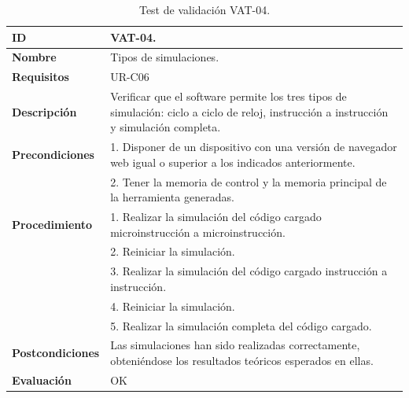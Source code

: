 \begin{center}
\begin{table}[htb]
\centering
\caption{Test de validación VAT-04.}
\begin{tabular}{@{}p{2.5cm} p{9cm}@{}} 
\toprule
\textbf{ID} 					& VAT-04. \\
\midrule
\textbf{Nombre} 				& Tipos de simulaciones. \\
\midrule
\textbf{Requisitos} 		& UR-C06\\
\midrule
\textbf{Descripción} 		& Verificar que el software permite los tres tipos de simulación: ciclo a ciclo de reloj, instrucción a instrucción y simulación completa. \\
\midrule
\textbf{Precondiciones}		& 1. Disponer de un dispositivo con una versión de navegador web igual o superior a los indicados anteriormente. \\
											& 2. Tener la memoria de control y la memoria principal de la herramienta generadas. \\
\midrule
\textbf{Procedimiento}		& 1. Realizar la simulación del código cargado microinstrucción a microinstrucción.\\
											& 2. Reiniciar la simulación.\\
											& 3. Realizar la simulación del código cargado instrucción a instrucción.\\
											& 4. Reiniciar la simulación.\\
											& 5. Realizar la simulación completa del código cargado. \\
\midrule
\textbf{Postcondiciones} 		&  Las simulaciones han sido realizadas correctamente, obteniéndose los resultados teóricos esperados en ellas.\\
\midrule
\textbf{Evaluación} 			& OK \\
\bottomrule
\end{tabular}
\label{tab:vat-04}
\end{table}
\end{center}

